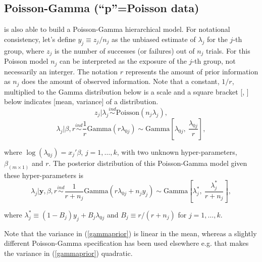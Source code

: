 \documentclass[article]{jss}
\begin{document}
\subsection[Poisson-Gamma]{Poisson-Gamma (``p''=Poisson data)}\label{poissonsubsec}
 is also able to build a Poisson-Gamma hierarchical model. For notational consistency, let's define $y_{j}\equiv z_{j} / n_{j}$ as the unbiased estimate of $\lambda_{j}$ for the $j$-th group, where  $z_{j}$ is the number of successes (or failures) out of $n_{j}$ trials. For this Poisson model $n_{j}$ can be interpreted as the exposure of the $j$-th group,  not necessarily an interger. The notation $r$ represents the amount of prior information as $n_{j}$ does the amount of observed information. Note that a constant, $1/r$, multiplied to the Gamma distribution below is a scale and a square bracket [, ] below indicates [mean, variance] of a distribution. 
\begin{equation}
z_{j}\vert \lambda_{j} \stackrel{ind}{\sim}\textrm{Poisson}(n_{j}\lambda_{j}),
\end{equation}
\begin{equation}\label{gammaprior}
\lambda_{j}\vert \beta, r\stackrel{ind}{\sim}\frac{1}{r}\textrm{Gamma}(r\lambda_{0j})\sim \textrm{Gamma} \left[\lambda_{0j}, ~\frac{\lambda_{0j}}{r} \right],
\end{equation}

where $\log(\lambda_{0j}) =x_{j}'\beta$, $j=1, \ldots, k$, with two unknown hyper-parameters, $\beta_{(m\times1)}$ and $r$. The posterior distribution of this Poisson-Gamma model given these hyper-parameters is
\begin{equation} \label{gammapost}
\lambda_{j}\vert \textbf{y}, \beta, r \stackrel{ind}{\sim}\frac{1}{r + n_{j}}\textrm{Gamma}(r\lambda_{0j} + n_{j}y_{j})\sim\textrm{Gamma} \left[\lambda^{\ast}_{j},~\frac{\lambda^{\ast}_{j}}{r+n_{j}} \right],
\end{equation}

where $\lambda^{\ast}_{j} \equiv (1-B_{j})y_{j} + B_{j}\lambda_{0j}$ and   $B_{j}\equiv r / (r+n_{j})$ for $j=1, \ldots, k$. 


Note that the variance in (\ref{gammaprior}) is linear in the mean, whereas a slightly different Poisson-Gamma specification \citep{1997} has been used elsewhere e.g. that makes the variance in (\ref{gammaprior}) quadratic.
\end{document}
